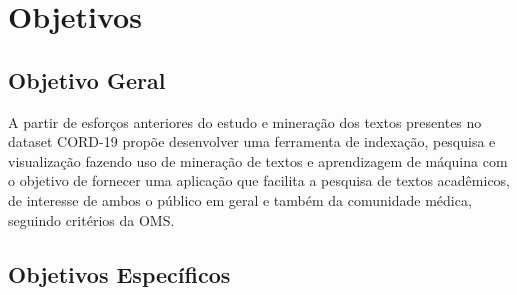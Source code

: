 \documentclass[
	12pt,				%
	a4paper,			%
	english,			%
	brazil,				%
	]{article}
\begin{document}

\section{Objetivos}



\subsection{Objetivo Geral}

    A partir de esfor\c cos anteriores do estudo e minera\c c\~ ao dos textos presentes no dataset CORD-19
    prop\~oe desenvolver uma ferramenta de indexa\c c\~ ao, pesquisa e visualiza\c c\~ ao
    fazendo uso de minera\c c\~ ao de textos e aprendizagem de m\' aquina
    com o objetivo de fornecer uma aplica\c c\~ ao que facilita a pesquisa de textos acad\^ emicos,
    de interesse de ambos o público em geral e também da comunidade m\' edica,
    seguindo crit\' erios da OMS.


\subsection{Objetivos Espec\' ificos}
\end{document}

